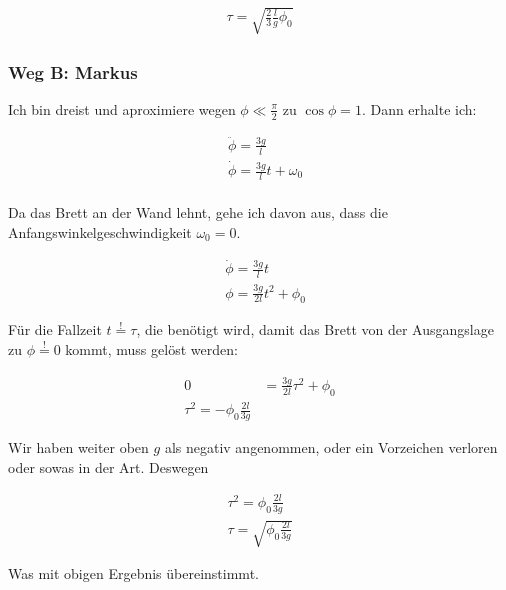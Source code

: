 \documentclass[a4paper,german,12pt,smallheadings]{scrartcl}
\begin{document}
\begin{align*}
  \tau = \sqrt{\frac{2}{3} \frac{l}{g} \phi_0}
\end{align*}

\subsubsection*{Weg B: Markus}

Ich bin dreist und aproximiere wegen $\phi \ll \frac{\pi}{2}$ zu $\cos \phi = 1$. Dann erhalte ich:

\begin{align*}
  &\ddot{\phi} = \frac{3g}{l} \\
  &\dot{\phi} = \frac{3g}{l}t + \omega_0 \\
\end{align*}

Da das Brett an der Wand lehnt, gehe ich davon aus, dass die Anfangswinkelgeschwindigkeit $\omega_0 = 0$.

\begin{align*}
  &\dot{\phi} = \frac{3g}{l}t\\
  &\phi = \frac{3g}{2l} t^2 + \phi_0
\end{align*}

Für die Fallzeit $t \overset{!}{=} \tau$, die benötigt wird, damit das Brett von der
Ausgangslage zu $\phi \overset{!}{=} 0$ kommt, muss gelöst werden:

\begin{align*}
  0 &= \frac{3g}{2l} \tau^2 + \phi_0 \\
  \tau^2 = -\phi_0 \frac{2l}{3g}
\end{align*}

Wir haben weiter oben $g$ als negativ angenommen, oder ein Vorzeichen verloren oder sowas in der Art. Deswegen

\begin{align*}
  \tau^2 = \phi_0 \frac{2l}{3g} \\
  \tau = \sqrt{\phi_0 \frac{2l}{3g}}
\end{align*}

Was mit obigen Ergebnis übereinstimmt.
\end{document}
